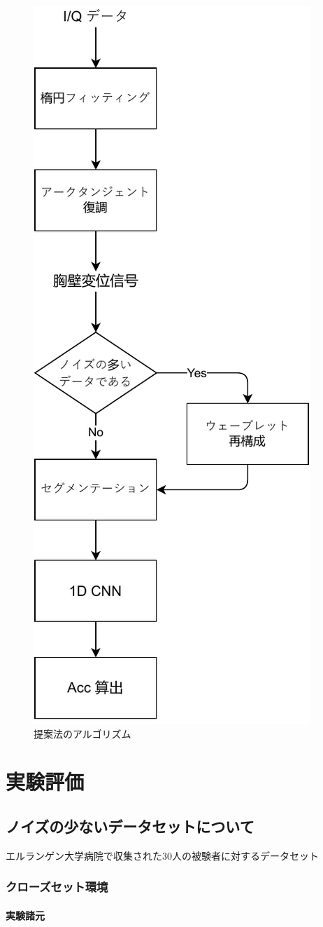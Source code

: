 \begin{figure}[H]
\begin{center}
\includegraphics[width=0.5\linewidth]{./fig/proposed_method.pdf}
\end{center}
\caption{提案法のアルゴリズム}
\label{fig:proposed_method}
\end{figure}

\chapter{実験評価}
\section{ノイズの少ないデータセットについて}
エルランゲン大学病院で収集された30人の被験者に対するデータセット
\subsection{クローズセット環境}
\subsubsection{実験諸元}
